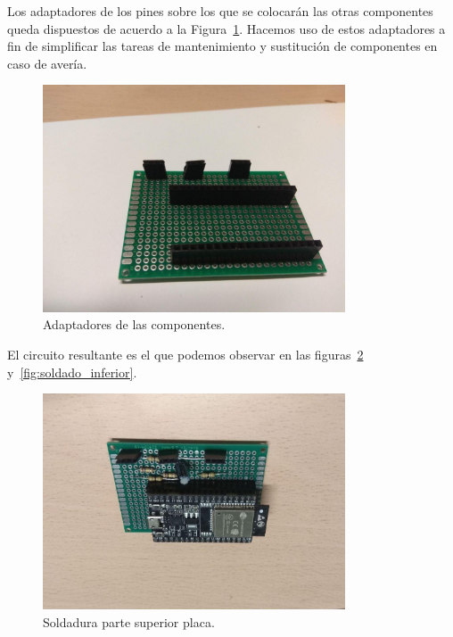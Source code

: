 \documentclass[a4paper,10pt]{article}
\begin{document}
Los adaptadores de los pines sobre los que se colocarán las otras
componentes queda dispuestos de acuerdo a la
Figura~\ref{fig:visual-adaptadores}. Hacemos uso de estos adaptadores
a fin de simplificar las tareas de mantenimiento y sustitución de
componentes en caso de avería.

\begin{figure}
  \centering
  \includegraphics[width=0.8\textwidth]{img/placa_con_adaptadores_pines.jpg}
  \caption{Adaptadores de las componentes.}\label{fig:visual-adaptadores}
\end{figure}

El circuito resultante es el que podemos observar en las
figuras~\ref{fig:soldado_superior} y~\ref{fig:soldado_inferior}.

\begin{figure}
  \centering
  \includegraphics[width=0.8\textwidth]{img/soldadura_superior.jpg}
  \caption{Soldadura parte superior placa.}\label{fig:soldado_superior}
\end{figure}
\end{document}
